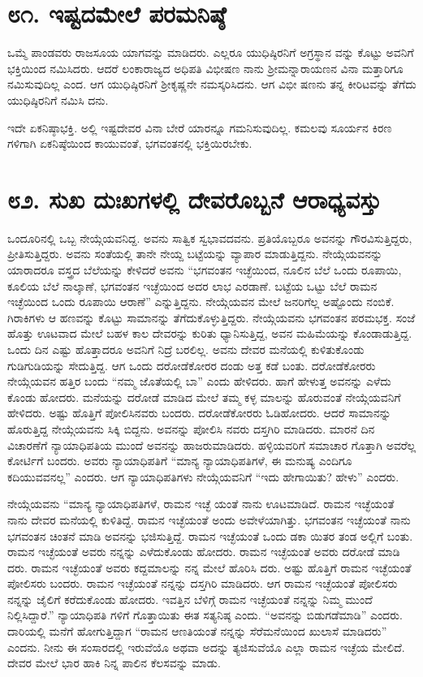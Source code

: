 \section{\num{೮೧. } ಇಷ್ಟದಮೇಲೆ ಪರಮನಿಷ್ಠೆ}

ಒಮ್ಮೆ ಪಾಂಡವರು ರಾಜಸೂಯ ಯಾಗವನ್ನು ಮಾಡಿದರು. ಎಲ್ಲರೂ ಯುಧಿಷ್ಠಿರನಿಗೆ ಅಗ್ರಸ್ಥಾನ ವನ್ನು ಕೊಟ್ಟು ಅವನಿಗೆ ಭಕ್ತಿಯಿಂದ ನಮಿಸಿದರು. ಆದರೆ ಲಂಕಾರಾಜ್ಯದ ಅಧಿಪತಿ ವಿಭೀಷಣ ನಾನು ಶ್ರೀಮನ್ನಾರಾಯಣನ ವಿನಾ ಮತ್ತಾರಿಗೂ ನಮಿಸುವುದಿಲ್ಲ ಎಂದ. ಆಗ ಯುಧಿಷ್ಠಿರನಿಗೆ ಶ್ರೀಕೃಷ್ಣನೇ ನಮಸ್ಕರಿಸಿದನು. ಆಗ ವಿಭೀ ಷಣನು ತನ್ನ ಕೀರಿಟವನ್ನು ತೆಗೆದು ಯುಧಿಷ್ಠಿರನಿಗೆ ನಮಿಸಿ ದನು.

ಇದೇ ಏಕನಿಷ್ಠಾಭಕ್ತಿ. ಅಲ್ಲಿ ಇಷ್ಟದೇವರ ವಿನಾ ಬೇರೆ ಯಾರನ್ನೂ ಗಮನಿಸುವುದಿಲ್ಲ. ಕಮಲವು ಸೂರ್ಯನ ಕಿರಣ ಗಳಿಗಾಗಿ ಏಕನಿಷ್ಠೆಯಿಂದ ಕಾಯುವಂತೆ, ಭಗವಂತನಲ್ಲಿ ಭಕ್ತಿಯಿರಬೇಕು.


\section{\num{೮೨. } ಸುಖ ದುಃಖಗಳಲ್ಲಿ ದೇವರೊಬ್ಬನೆ ಆರಾಧ್ಯವಸ್ತು}

ಒಂದೂರಿನಲ್ಲಿ ಒಬ್ಬ ನೇಯ್ಗೆಯವನಿದ್ದ. ಅವನು ಸಾತ್ವಿಕ ಸ್ವಭಾವದವನು. ಪ್ರತಿಯೊಬ್ಬರೂ ಅವನನ್ನು ಗೌರವಿಸುತ್ತಿದ್ದರು, ಪ್ರೀತಿಸುತ್ತಿದ್ದರು. ಅವನು ಸಂತೆಯಲ್ಲಿ ತಾನೇ ನೇಯ್ದ ಬಟ್ಟೆಯನ್ನು ವ್ಯಾಪಾರ ಮಾಡುತ್ತಿದ್ದನು. ನೇಯ್ಗೆಯವನನ್ನು ಯಾರಾದರೂ ವಸ್ತ್ರದ ಬೆಲೆಯನ್ನು ಕೇಳಿದರೆ ಅವನು “ಭಗವಂತನ ಇಚ್ಛೆಯಿಂದ, ನೂಲಿನ ಬೆಲೆ ಒಂದು ರೂಪಾಯಿ, ಕೂಲಿಯ ಬೆಲೆ ನಾಲ್ಕಾಣೆ, ಭಗವಂತನ ಇಚ್ಛೆಯಿಂದ ಅದರ ಲಾಭ ಎರಡಾಣೆ. ಬಟ್ಟೆಯ ಒಟ್ಟು ಬೆಲೆ ರಾಮನ ಇಚ್ಛೆಯಿಂದ ಒಂದು ರೂಪಾಯಿ ಆರಾಣೆ” ಎನ್ನುತ್ತಿದ್ದನು. ನೇಯ್ಗೆಯವನ ಮೇಲೆ ಜನರಿಗೆಲ್ಲ ಅಷ್ಟೊಂದು ನಂಬಿಕೆ. ಗಿರಾಕಿಗಳು ಆ ಹಣವನ್ನು ಕೊಟ್ಟು ಸಾಮಾನನ್ನು ತೆಗೆದುಕೊಳ್ಳುತ್ತಿದ್ದರು. ನೇಯ್ಗೆಯವನು ಭಗವಂತನ ಪರಮಭಕ್ತ. ಸಂಜೆ ಹೊತ್ತು ಊಟವಾದ ಮೇಲೆ ಬಹಳ ಕಾಲ ದೇವರನ್ನು ಕುರಿತು ಧ್ಯಾನಿಸುತ್ತಿದ್ದ, ಅವನ ಮಹಿಮೆಯನ್ನು ಕೊಂಡಾಡುತ್ತಿದ್ದ. ಒಂದು ದಿನ ಎಷ್ಟು ಹೊತ್ತಾದರೂ ಅವನಿಗೆ ನಿದ್ರೆ ಬರಲಿಲ್ಲ. ಅವನು ದೇವರ ಮನೆಯಲ್ಲಿ ಕುಳಿತುಕೊಂಡು ಗುಡಿಗುಡಿಯನ್ನು ಸೇದುತ್ತಿದ್ದ. ಆಗ ಒಂದು ದರೋಡೆಕೋರರ ದಂಡು ಅತ್ತ ಕಡೆ ಬಂತು. ದರೋಡೆಕೋರರು ನೇಯ್ಗೆಯವನ ಹತ್ತಿರ ಬಂದು “ನಮ್ಮ ಜೊತೆಯಲ್ಲಿ ಬಾ” ಎಂದು ಹೇಳಿದರು. ಹಾಗೆ ಹೇಳುತ್ತ ಅವನನ್ನು ಎಳೆದು ಕೊಂಡು ಹೋದರು. ಮನೆಯನ್ನು ದರೋಡೆ ಮಾಡಿದ ಮೇಲೆ ತಮ್ಮ ಕಳ್ಳ ಮಾಲನ್ನು ಹೊರುವಂತೆ ನೇಯ್ಗೆಯವನಿಗೆ ಹೇಳಿದರು. ಅಷ್ಟು ಹೊತ್ತಿಗೆ ಪೋಲಿಸಿನವರು ಬಂದರು. ದರೋಡೆಕೋರರು ಓಡಿಹೋದರು. ಆದರೆ ಸಾಮಾನನ್ನು ಹೊರುತ್ತಿದ್ದ ನೇಯ್ಗೆಯವನು ಸಿಕ್ಕಿ ಬಿದ್ದನು. ಅವನನ್ನು ಪೋಲಿಸಿ ನವರು ದಸ್ತಗಿರಿ ಮಾಡಿದರು. ಮಾರನೆ ದಿನ ವಿಚಾರಣೆಗೆ ನ್ಯಾಯಾಧಿಪತಿಯ ಮುಂದೆ ಅವನನ್ನು ಹಾಜರುಮಾಡಿದರು. ಹಳ್ಳಿಯವರಿಗೆ ಸಮಾಚಾರ ಗೊತ್ತಾಗಿ ಅವರೆಲ್ಲ ಕೋರ್ಟಿಗೆ ಬಂದರು. ಅವರು ನ್ಯಾಯಾಧಿಪತಿಗೆ “ಮಾನ್ಯ ನ್ಯಾಯಾಧಿಪತಿಗಳೆ, ಈ ಮನುಷ್ಯ ಎಂದಿಗೂ ಕದಿಯುವವನಲ್ಲ” ಎಂದರು. ಆಗ ನ್ಯಾಯಾಧಿಪತಿಗಳು ನೇಯ್ಗೆಯವನಿಗೆ “ಇದು ಹೇಗಾಯಿತು? ಹೇಳು” ಎಂದರು.

ನೇಯ್ಗೆಯವನು “ಮಾನ್ಯ ನ್ಯಾಯಾಧಿಪತಿಗಳೆ, ರಾಮನ ಇಚ್ಛೆ ಯಂತೆ ನಾನು ಊಟಮಾಡಿದೆ. ರಾಮನ ಇಚ್ಛೆಯಂತೆ ನಾನು ದೇವರ ಮನೆಯಲ್ಲಿ ಕುಳಿತಿದ್ದೆ. ರಾಮನ ಇಚ್ಛೆಯಂತೆ ಅಂದು ಅವೇಳೆಯಾಗಿತ್ತು. ಭಗವಂತನ ಇಚ್ಛೆಯಂತೆ ನಾನು ಭಗವಂತನ ಚಿಂತನೆ ಮಾಡಿ ಅವನನ್ನು ಭಜಿಸುತ್ತಿದ್ದೆ. ರಾಮನ ಇಚ್ಛೆಯಂತೆ ಒಂದು ಡಕಾ ಯಿತರ ತಂಡ ಅಲ್ಲಿಗೆ ಬಂತು. ರಾಮನ ಇಚ್ಛೆಯಂತೆ ಅವರು ನನ್ನನ್ನು ಎಳೆದುಕೊಂಡು ಹೋದರು. ರಾಮನ ಇಚ್ಛೆಯಂತೆ ಅವರು ದರೋಡೆ ಮಾಡಿ ದರು. ರಾಮನ ಇಚ್ಛೆಯಂತೆ ಅವರು ಕದ್ದಮಾಲನ್ನು ನನ್ನ ಮೇಲೆ ಹೊರಿಸಿ ದರು. ಅಷ್ಟು ಹೊತ್ತಿಗೆ ರಾಮನ ಇಚ್ಛೆಯಂತೆ ಪೋಲಿಸರು ಬಂದರು. ರಾಮನ ಇಚ್ಛೆಯಂತೆ ನನ್ನನ್ನು ದಸ್ತಗಿರಿ ಮಾಡಿದರು. ಆಗ ರಾಮನ ಇಚ್ಛೆಯಂತೆ ಪೋಲಿಸರು ನನ್ನನ್ನು ಜೈಲಿಗೆ ಕರೆದುಕೊಂಡು ಹೋದರು. ಇವತ್ತಿನ ಬೆಳಿಗ್ಗೆ ರಾಮನ ಇಚ್ಛೆಯಂತೆ ನನ್ನನ್ನು ನಿಮ್ಮ ಮುಂದೆ ನಿಲ್ಲಿಸಿದ್ದಾರೆ.” ನ್ಯಾಯಾಧಿಪತಿ ಗಳಿಗೆ ಗೊತ್ತಾಯಿತು ಈತ ಸತ್ಯನಿಷ್ಠ ಎಂದು. “ಅವನನ್ನು ಬಿಡುಗಡೆಮಾಡಿ” ಎಂದರು. ದಾರಿಯಲ್ಲಿ ಮನೆಗೆ ಹೋಗುತ್ತಿದ್ದಾಗ “ರಾಮನ ಆಣತಿಯಂತೆ ನನ್ನನ್ನು ಸೆರೆಮನೆಯಿಂದ ಖುಲಾಸೆ ಮಾಡಿದರು” ಎಂದನು. ನೀನು ಈ ಸಂಸಾರದಲ್ಲಿ ಇರುವೆಯೊ ಅಥವಾ ಅದನ್ನು ತ್ಯಜಿಸುವೆಯೊ ಎಲ್ಲಾ ರಾಮನ ಇಚ್ಛೆಯ ಮೇಲಿದೆ. ದೇವರ ಮೇಲೆ ಭಾರ ಹಾಕಿ ನಿನ್ನ ಪಾಲಿನ ಕೆಲಸವನ್ನು ಮಾಡು.


